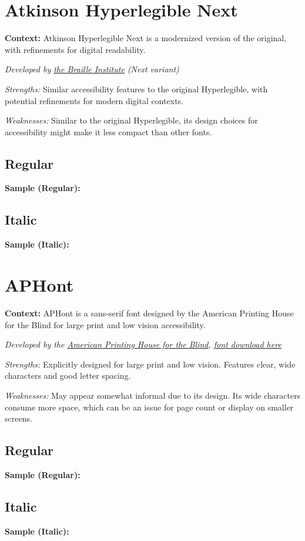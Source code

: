 \pagebreak
\section{Atkinson Hyperlegible Next}\label{troubleAtkinsonNext}
\noindent
\textbf{Context:} Atkinson Hyperlegible Next is a modernized version of the original, with refinements for digital readability.

\emph{Developed by \href{https://brailleinstitute.org/freefont}{the Braille Institute} (Next variant)}
\begin{raggedright}
\emph{Strengths:} Similar accessibility features to the original Hyperlegible, with potential refinements for modern digital contexts.

\emph{Weaknesses:} Similar to the original Hyperlegible, its design choices for accessibility might make it less compact than other fonts.

\subsection{Regular}
\noindent\textbf{Sample (Regular):}
\FontSample{\atkinsonnextfont}

\subsection{Italic}
\noindent\textbf{Sample (Italic):}
\FontSample{{\atkinsonnextfont\itshape}}
\end{raggedright}


\pagebreak
\section{APHont}\label{trouble7}
\noindent
\textbf{Context:} APHont is a sans-serif font designed by the American Printing House for the Blind for large print and low vision accessibility.

\emph{Developed by the \href{https://www.aph.org/resources/large-print-guidelines/}{American Printing House for the Blind}, \href{https://www.aph.org/resources/large-print-guidelines/}{font download here}}
\begin{raggedright}
\emph{Strengths:} Explicitly designed for large print and low vision. Features clear, wide characters and good letter spacing.

\emph{Weaknesses:} May appear somewhat informal due to its design. Its wide characters consume more space, which can be an issue for page count or display on smaller screens.

\subsection{Regular}
\noindent\textbf{Sample (Regular):}
\FontSample{\aphontfont}

\subsection{Italic}
\noindent\textbf{Sample (Italic):}
\FontSample{{\aphontfont\itshape}}
\end{raggedright}


